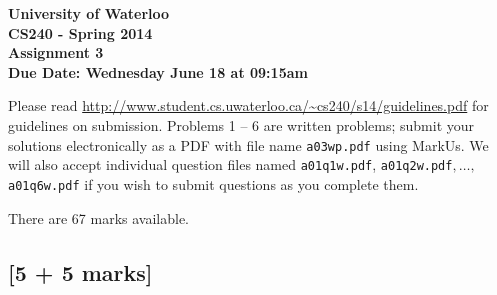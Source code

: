 \documentclass[12pt]{article}
\begin{document}
\begin{center}
  {\Large\bf University of Waterloo}\\
  \vspace{3mm}
         {\Large\bf CS240 - Spring 2014}\\
         \vspace{2mm}
                {\Large\bf Assignment 3}\\
                \vspace{3mm}
                \textbf{Due Date: Wednesday June 18 at 09:15am}
\end{center}

Please read
\url{http://www.student.cs.uwaterloo.ca/~cs240/s14/guidelines.pdf}
for guidelines on submission.
Problems 1 -- 6 are written
problems; submit your solutions electronically as a PDF with file name {\tt a03wp.pdf} using MarkUs. We will also accept individual question files named {\tt a01q1w.pdf}, {\tt a01q2w.pdf}$, \dots,$ {\tt a01q6w.pdf} if you wish to submit questions as you complete them.

There are 67 marks available.

\subsection{[5 + 5 marks]}
\end{document}
